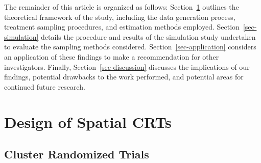 \documentclass[
  12pt,
  prelim]{bios-prelim}
\begin{document}
The remainder of this article is organized as follows:
Section~\ref{sec-design} outlines the theoretical framework of the
study, including the data generation process, treatment sampling
procedures, and estimation methods employed.
Section~\ref{sec-simulation} details the procedure and results of the
simulation study undertaken to evaluate the sampling methods considered.
Section~\ref{sec-application} considers an application of these findings
to make a recommendation for other investigators. Finally,
Section~\ref{sec-discussion} discusses the implications of our findings,
potential drawbacks to the work performed, and potential areas for
continued future research.

\section{Design of Spatial CRTs}\label{sec-design}

\subsection{Cluster Randomized Trials}\label{cluster-randomized-trials}
\end{document}
